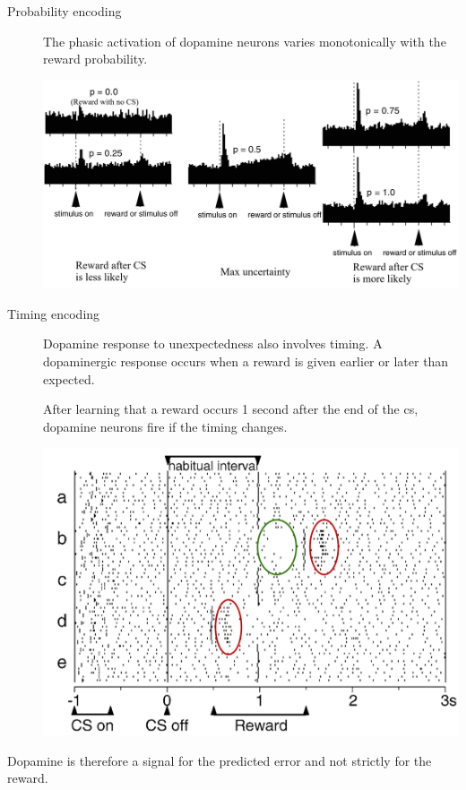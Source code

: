\begin{description}
    \item[Probability encoding] 
        The phasic activation of dopamine neurons varies monotonically with the reward probability.
        \begin{casestudy}
            \phantom{}
            \begin{center}
                \includegraphics[width=0.65\linewidth]{./img/dopamine_probability.png}
            \end{center}
        \end{casestudy}

    \item[Timing encoding] 
        Dopamine response to unexpectedness also involves timing.
        A dopaminergic response occurs when a reward is given earlier or later than expected.

        \begin{casestudy}
            After learning that a reward occurs 1 second after the end of the \ac{cs}, 
            dopamine neurons fire if the timing changes.
            \begin{center}
                \includegraphics[width=0.5\linewidth]{./img/dopamine_timing.png}
            \end{center}
        \end{casestudy}
\end{description}

\begin{remark}
    Dopamine is therefore a signal for the predicted error and not strictly for the reward.
\end{remark}